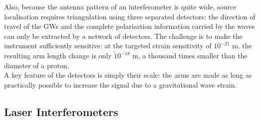 \documentclass[binding=0.6cm, LaM]{sapthesis}
\begin{document}


	Also, because the antenna pattern of an interferometer is quite wide, 
	source localisation requires triangulation using three separated detectors: 
	the direction of travel of the GWs and the complete polarisation information carried by the waves can only be extracted by a network of detectors. 
	The challenge is to make the instrument sufficiently sensitive: 
	at the targeted strain sensitivity of $10^{−21}$ m, the resulting arm length change is only $\tilde 10^{-18}$ m, 
	a thousand times smaller than the diameter of a proton. \\
	A key feature of the detectors is simply their scale: 
	the arms are made as long as practically possible to increase the signal due to a gravitational wave strain. 

\subsection{Laser Interferometers}
\end{document}
